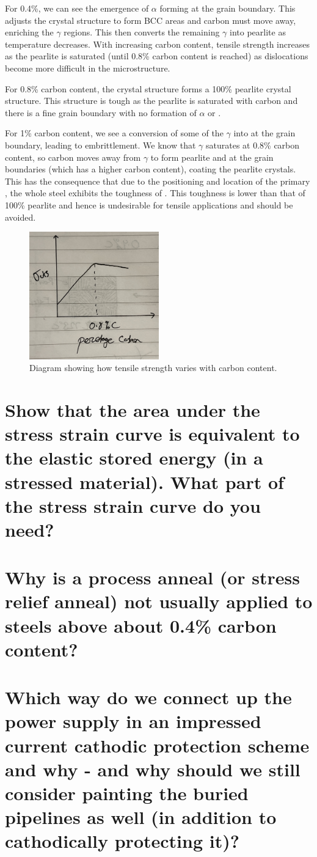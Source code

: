 \documentclass[11pt]{article}
\begin{document}
For 0.4\%, we can see the emergence of $\alpha$ forming at the grain boundary. This adjusts the crystal structure to form BCC areas and carbon must move away, enriching the $\gamma$ regions. This then converts the remaining $\gamma$ into pearlite as temperature decreases. With increasing carbon content, tensile strength increases as the pearlite is saturated (until 0.8\% carbon content is reached) as dislocations become more difficult in the microstructure. 

For 0.8\% carbon content, the crystal structure forms a 100\% pearlite crystal structure. This structure is tough as the pearlite is saturated with carbon and there is a fine grain boundary with no formation of $\alpha$ or .

For 1\% carbon content, we see a conversion of some of the $\gamma$ into  at the grain boundary, leading to embrittlement. We know that $\gamma$ saturates at 0.8\% carbon content, so carbon moves away from $\gamma$ to form pearlite and  at the grain boundaries (which has a higher carbon content), coating the pearlite crystals. This has the consequence that due to the positioning and location of the primary , the whole steel exhibits the toughness of . This toughness is lower than that of 100\% pearlite and hence is undesirable for tensile applications and should be avoided. 
\begin{figure}[H]
    \centering
    \includegraphics[width = 0.5\textwidth]{./img/q1c.jpg}
    \caption{Diagram showing how tensile strength varies with carbon content.}
\end{figure}
\section{Show that the area under the stress strain curve is equivalent to the elastic stored energy (in a stressed material). What part of the stress strain curve do you need?}
\section{Why is a process anneal (or stress relief anneal) not usually applied to steels above about 0.4\% carbon content? }
\section{Which way do we connect up the power supply in an impressed current cathodic protection scheme and why - and why should we still consider painting the buried pipelines as well (in addition to cathodically protecting it)?}
\end{document}
